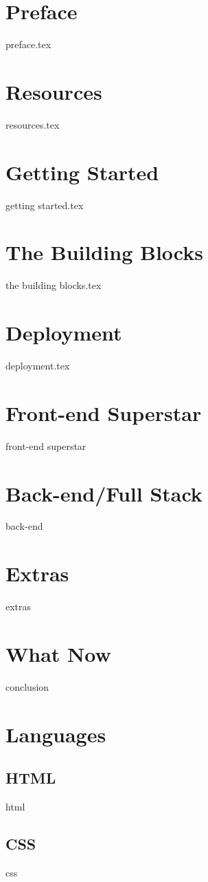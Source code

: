 \documentclass[12pt, oneside]{book}
\begin{document}
\maketitle
\tableofcontents

\chapter*{Preface}
{preface.tex}

\chapter*{Resources}
{resources.tex}

\chapter{Getting Started}
{getting started.tex}

\chapter{The Building Blocks}
{the building blocks.tex}

\chapter{Deployment}
{deployment.tex}

\chapter{Front-end Superstar}
{front-end superstar}

\chapter{Back-end/Full Stack}
{back-end}

\chapter{Extras}
{extras}

\chapter{What Now}
{conclusion}

\chapter{Languages}
\section{HTML}
{html}

\section{CSS}
{css}
\end{document}
